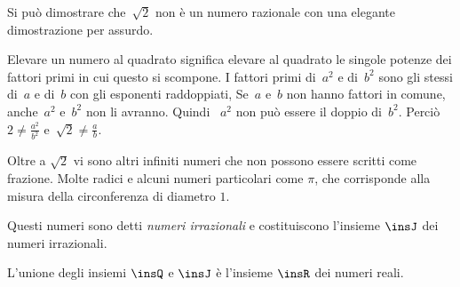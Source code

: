 Si può dimostrare che~$\sqrt{2}$ non è un numero razionale con una elegante 
dimostrazione per assurdo. 


Elevare un numero al quadrato significa elevare al quadrato le
singole potenze dei fattori primi in cui questo si scompone. I fattori
primi di~$a^{2}$ e di~$b^{2}$ sono gli stessi di~$a$ e di~$b$ con
gli esponenti raddoppiati, Se~$a$ e~$b$ non hanno fattori in comune, 
anche~$a^{2}$ e~$b^{2}$ non li avranno. Quindi ~$a^{2}$ non può essere il 
doppio di~$b^{2}$.
Perciò~$2\ne\frac{a^{2}}{b^{2}}$ e~$\sqrt{2}\ne\frac{a}{b}$.

Oltre a $\sqrt{2}$ vi sono altri infiniti numeri che non possono essere scritti 
come frazione. Molte radici e alcuni numeri particolari come $\pi$, 
che corrisponde alla misura della circonferenza di diametro $1$.

Questi numeri sono detti \emph{numeri irrazionali} e costituiscono l'insieme 
$\insJ$ dei numeri irrazionali.

L'unione degli insiemi $\insQ$ e $\insJ$ è l'insieme $\insR$ dei numeri reali.


